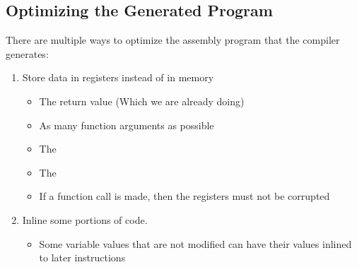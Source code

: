 \subsection{Optimizing the Generated Program}\label{subsec:Optimize_Compiler_Program}
There are multiple ways to optimize the assembly program that the compiler generates:
\begin{enumerate}[noitemsep]
\item Store data in registers instead of in memory
  \begin{itemize}[noitemsep]
  \item The return value (Which we are already doing)
  \item As many function arguments as possible
  \item The 
  \item The 
  \end{itemize}
  \begin{itemize}[noitemsep]
  \item If a function call is made, then the registers must not be corrupted
  \end{itemize}
\item Inline some portions of code.
  \begin{itemize}[noitemsep]
  \item Some variable values that are not modified can have their values inlined to later instructions
  \end{itemize}
\end{enumerate}

